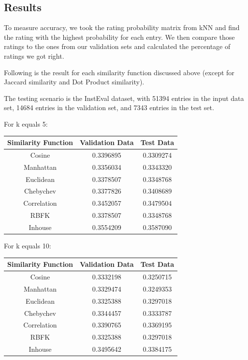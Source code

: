 \documentclass{article}
\begin{document}
\subsection{Results}

To measure accuracy, we took the rating probability matrix from kNN and find the rating with the highest probability for each entry. We then compare those ratings to the ones from our validation sets and calculated the percentage of ratings we got right. 

Following is the result for each similarity function discussed above (except for Jaccard similarity and Dot Product similarity). 

The testing scenario is the InstEval dataset, with 51394 entries in the input data set, 14684 entries in the validation set, and 7343 entries in the test set. 

For k equals 5:

\begin{center}
    \begin{tabular}{c|c|c}
        Similarity Function & Validation Data & Test Data \\
        \hline
        Cosine & 0.3396895 & 0.3309274 \\
        Manhattan & 0.3356034 & 0.3343320 \\
        Euclidean & 0.3378507 & 0.3348768 \\
        Chebychev & 0.3377826 & 0.3408689 \\
        Correlation & 0.3452057	& 0.3479504 \\
        RBFK & 0.3378507 & 0.3348768 \\
        Inhouse & 0.3554209 & 0.3587090 \\
    \end{tabular}
\end{center}

For k equals 10:

\begin{center}
    \begin{tabular}{c|c|c}
        Similarity Function & Validation Data & Test Data \\
        \hline
        Cosine & 0.3332198 & 0.3250715 \\
        Manhattan & 0.3329474 & 0.3249353 \\
        Euclidean & 0.3325388 & 0.3297018 \\
        Chebychev & 0.3344457 & 0.3333787 \\
        Correlation & 0.3390765 & 0.3369195 \\
        RBFK & 0.3325388 & 0.3297018 \\
        Inhouse & 0.3495642 & 0.3384175 \\
    \end{tabular}
\end{center}
\end{document}
